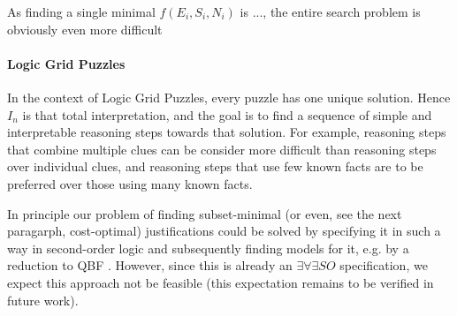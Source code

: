 As finding a single minimal $f(E_i,S_i,N_i)$ is ..., the entire search problem is obviously even more difficult 


\paragraph{Logic Grid Puzzles} In the context of Logic Grid Puzzles, every puzzle has one unique solution. Hence $I_n$ is that total interpretation, and the goal is to find a sequence of simple and interpretable reasoning steps towards that solution. For example, reasoning steps that combine multiple clues can be consider more difficult than reasoning steps over individual clues, and reasoning steps that use few known facts are to be preferred over those using many known facts.





In principle our problem of finding subset-minimal (or even, see the next paragarph, cost-optimal) justifications could be solved by specifying it in such a way in second-order logic and subsequently finding models for it, e.g. by a reduction to QBF \cite{kr/BogaertsTS16,kr/vanderHallenJ18}. 
However, since this is already an $\exists\forall\exists SO$ specification, we expect this approach not be feasible (this expectation remains to be verified in future work). 
